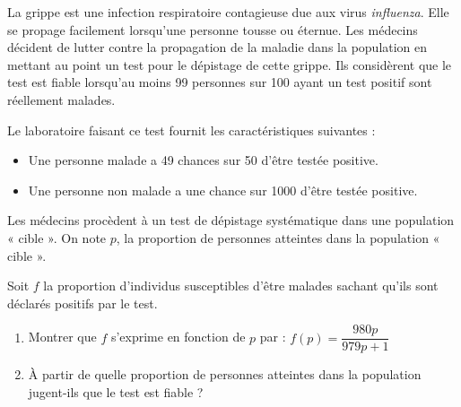 \begin{exercice}
La grippe est une infection respiratoire contagieuse due aux virus \emph{influenza}. Elle se propage facilement lorsqu’une personne tousse ou éternue. Les médecins décident de lutter contre la propagation de la maladie dans la population en mettant au point un test pour le dépistage de cette grippe. Ils considèrent que le test est fiable lorsqu’au moins 99 personnes sur 100 ayant un test positif sont réellement malades. 

Le laboratoire faisant ce test fournit les caractéristiques suivantes :

\begin{itemize}
    \item Une personne malade a 49 chances sur 50 d’être testée positive.
    \item Une personne non malade a une chance sur 1000 d’être testée positive.
\end{itemize}

Les médecins procèdent à un test de dépistage systématique dans une population « cible ». On note $p$, la proportion de personnes atteintes dans la population « cible ».

Soit $f$ la proportion d’individus susceptibles d’être malades sachant qu’ils sont déclarés positifs par le test.

\begin{enumerate}
    \item Montrer que $f$ s’exprime en fonction de $p$ par : 
  $  
    f(p) = \dfrac{980p}{979p + 1}
   $
    \item À partir de quelle proportion de personnes atteintes dans la population jugent-ils que le test est fiable ?
\end{enumerate}
\end{exercice}


